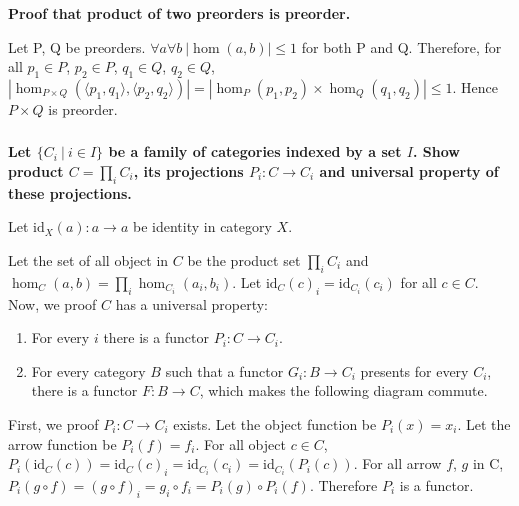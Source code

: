 \documentclass{article}
\begin{document}
\subsubsection{}

\textbf{Proof that product of two preorders is preorder.}

Let P, Q be preorders. $\forall a \forall b\ | \hom(a, b) | \leq 1$ for both P and Q. Therefore, for all $p_1 \in P$, $p_2 \in P$, $q_1 \in Q$, $q_2 \in Q$, $| \hom_{P \times Q}(\langle p_1, q_1 \rangle, \langle p_2, q_2 \rangle) | = | \hom_P(p_1, p_2) \times \hom_Q(q_1, q_2) | \leq 1$. Hence $P \times Q$ is preorder.

\subsubsection{}

\textbf{Let $\{C_i\ |\ i \in I\}$ be a family of categories indexed by a set $I$. Show product $C = \prod_i C_i$, its projections $P_i : C \rightarrow C_i$ and universal property of these projections.}

Let $\mathrm{id}_X(a) : a \rightarrow a$ be identity in category $X$.

Let the set of all object in $C$ be the product set $\prod_i C_i$ and $\hom_C(a, b) = \prod_i \hom_{C_i}(a_i, b_i)$. Let $\mathrm{id}_C(c)_i = \mathrm{id}_{C_i}(c_i)$ for all $c \in C$. Now, we proof $C$ has a universal property:

\begin{enumerate}
\item For every $i$ there is a functor $P_i : C \rightarrow C_i$.
\item For every category $B$ such that a functor $G_i : B \rightarrow C_i$ presents for every $C_i$, there is a functor $F : B \rightarrow C$, which makes the following diagram commute.

\begin{center}
\end{center}
\end{enumerate}

First, we proof $P_i : C \rightarrow C_i$ exists. Let the object function be $P_i(x) = x_i$. Let the arrow function be $P_i(f) = f_i$. For all object $c \in C$, $P_i(\mathrm{id}_C(c)) = \mathrm{id}_C(c)_i = \mathrm{id}_{C_i}(c_i) = \mathrm{id}_{C_i}(P_i(c))$. For all arrow $f$, $g$ in C, $P_i(g \circ f) = (g \circ f)_i = g_i \circ f_i =  P_i(g) \circ P_i(f)$. Therefore $P_i$ is a functor.
\end{document}
